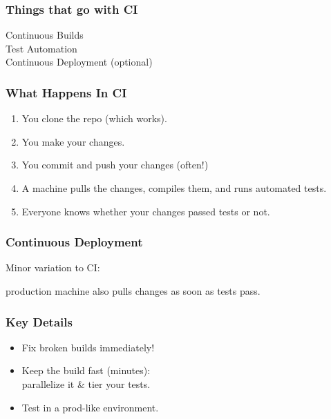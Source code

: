 \documentclass{beamer}
\newenvironment{changemargin}[1]{%
  \begin{list}{}{%
    \setlength{\topsep}{0pt}%
    \setlength{\leftmargin}{#1}%
    \setlength{\rightmargin}{1em}
    \setlength{\listparindent}{\parindent}%
    \setlength{\itemindent}{\parindent}%
    \setlength{\parsep}{\parskip}%
  }%
  \item[]}{\end{list}}
\begin{document}
\begin{frame}
  \frametitle{Things that go with CI}

  \Large
  \begin{changemargin}{1cm}
    Continuous Builds\\[1em]
    Test Automation\\[1em]
    Continuous Deployment (optional)
  \end{changemargin}
\end{frame}

\begin{frame}
  \frametitle{What Happens In CI}

  \Large
  \begin{changemargin}{1cm}
    \begin{enumerate}
    \item You clone the repo (which works).
    \item You make your changes.
    \item You commit and push your changes (often!)
    \item A machine pulls the changes, compiles them, and runs automated tests.
      \item Everyone knows whether your changes passed tests or not.
    \end{enumerate}
  \end{changemargin}
\end{frame}

\begin{frame}
  \frametitle{Continuous Deployment}

  \Large
  \begin{changemargin}{1cm}
    Minor variation to CI: \\
    \begin{changemargin}{1cm}
      production machine also pulls changes as soon as tests pass.
    \end{changemargin}
  \end{changemargin}
\end{frame}

\begin{frame}
  \frametitle{Key Details}

  \Large
  \begin{changemargin}{1cm}
    \begin{itemize}
    \item Fix broken builds immediately!
    \item Keep the build fast (minutes):\\
      \hspace*{1cm} parallelize it \& tier your tests.
    \item Test in a prod-like environment.
    \end{itemize}
      
  \end{changemargin}
\end{frame}
\end{document}
